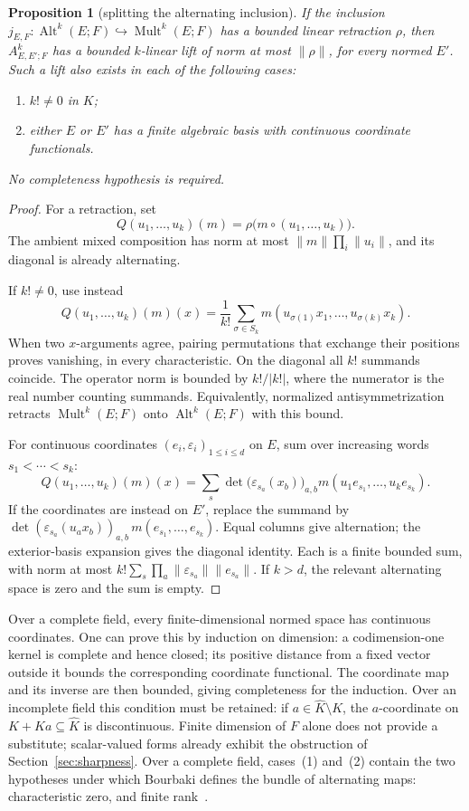 \documentclass[11pt]{amsart}
\newtheorem{proposition}[theorem]{Proposition}
\theoremstyle{definition}
\theoremstyle{remark}
\numberwithin{equation}{section}
\newcommand{\Alt}{\operatorname{Alt}}
\newcommand{\Mult}{\operatorname{Mult}}
\newcommand{\abs}[1]{\lvert #1\rvert}
\newcommand{\norm}[1]{\lVert #1\rVert}
\begin{document}
\begin{proposition}[splitting the alternating inclusion]\label{prop:split-lift}
If the inclusion $j_{E,F}\colon\Alt^k(E;F)\hookrightarrow\Mult^k(E;F)$ has a bounded linear retraction $\rho$, then $A^k_{E,E';F}$ has a bounded $k$-linear lift of norm at most $\norm\rho$, for every normed $E'$. Such a lift also exists in each of the following cases:
\begin{enumerate}
\item $k!\ne0$ in $K$;
\item either $E$ or $E'$ has a finite algebraic basis with continuous coordinate functionals.
\end{enumerate}
No completeness hypothesis is required.
\end{proposition}
\begin{proof}
For a retraction, set
\[
 Q(u_1,\ldots,u_k)(m)
 =\rho\bigl(m\circ(u_1,\ldots,u_k)\bigr).
\]
The ambient mixed composition has norm at most $\norm m\prod_i\norm{u_i}$, and its diagonal is already alternating.

If $k!\ne0$, use instead
\[
 Q(u_1,\ldots,u_k)(m)(x)
 =\frac1{k!}\sum_{\sigma\in S_k}
 m(u_{\sigma(1)}x_1,\ldots,u_{\sigma(k)}x_k).
\]
When two $x$-arguments agree, pairing permutations that exchange their positions proves vanishing, in every characteristic. On the diagonal all $k!$ summands coincide. The operator norm is bounded by $k!/\abs{k!}$, where the numerator is the real number counting summands. Equivalently, normalized antisymmetrization retracts $\Mult^k(E;F)$ onto $\Alt^k(E;F)$ with this bound.

For continuous coordinates $(e_i,\varepsilon_i)_{1\le i\le d}$ on $E$, sum over increasing words $s_1<\cdots<s_k$:
\[
 Q(u_1,\ldots,u_k)(m)(x)
 =\sum_s\det\bigl(\varepsilon_{s_a}(x_b)\bigr)_{a,b}
       m(u_1e_{s_1},\ldots,u_ke_{s_k}).
\]
If the coordinates are instead on $E'$, replace the summand by
$\det(\varepsilon_{s_a}(u_ax_b))_{a,b}\,m(e_{s_1},\ldots,e_{s_k})$.
Equal columns give alternation; the exterior-basis expansion gives the diagonal identity. Each is a finite bounded sum, with norm at most
$k!\sum_s\prod_a\norm{\varepsilon_{s_a}}\norm{e_{s_a}}$.
If $k>d$, the relevant alternating space is zero and the sum is empty.
\end{proof}

Over a complete field, every finite-dimensional normed space has continuous coordinates. One can prove this by induction on dimension: a codimension-one kernel is complete and hence closed; its positive distance from a fixed vector outside it bounds the corresponding coordinate functional. The coordinate map and its inverse are then bounded, giving completeness for the induction. Over an incomplete field this condition must be retained: if $a\in\widehat K\setminus K$, the $a$-coordinate on $K+Ka\subseteq\widehat K$ is discontinuous. Finite dimension of $F$ alone does not provide a substitute; scalar-valued forms already exhibit the obstruction of Section~\ref{sec:sharpness}. Over a complete field, cases~(1) and~(2) contain the two hypotheses under which Bourbaki defines the bundle of alternating maps: characteristic zero, and finite rank~\cite[n\textsuperscript{o}~7.8]{Bou}.
\end{document}
